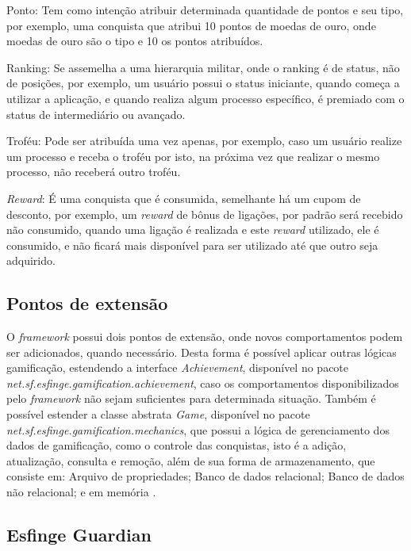 \par Ponto: Tem como intenção atribuir determinada quantidade de pontos e seu tipo, por exemplo, uma conquista que atribui 10 pontos de moedas de ouro, onde moedas de ouro são o tipo e 10 os pontos atribuídos. 
\par Ranking: Se assemelha a uma hierarquia militar, onde o ranking é de status, não de posições, por exemplo, um usuário possui o status iniciante, quando começa a utilizar a aplicação, e quando realiza algum processo específico, é premiado com o status de intermediário ou avançado. 
\par Troféu: Pode ser atribuída uma vez apenas, por exemplo, caso um usuário realize um processo e receba o troféu por isto, na próxima vez que realizar o mesmo processo, não receberá outro troféu. 
\par \textit{Reward}: É uma conquista que é consumida, semelhante há um cupom de desconto, por exemplo, um \textit{reward} de bônus de ligações, por padrão será recebido não consumido, quando uma ligação é realizada e este \textit{reward} utilizado, ele é consumido, e não ficará mais disponível para ser utilizado até que outro seja adquirido.

\subsection{Pontos de extensão}

O \textit{framework} possui dois pontos de extensão, onde novos comportamentos podem ser adicionados, quando necessário. Desta forma é possível aplicar outras lógicas gamificação, estendendo a interface \textit{Achievement}, disponível no pacote \textit{net.sf.esfinge.gamification.achievement}, caso os comportamentos disponibilizados pelo \textit{framework} não sejam suficientes para determinada situação. Também é possível estender a classe abstrata \textit{Game}, disponível no pacote \textit{net.sf.esfinge.gamification.mechanics}, que possui a lógica de gerenciamento dos dados de gamificação, como o controle das conquistas, isto é a adição, atualização, consulta e remoção, além de sua forma de armazenamento, que consiste em: Arquivo de propriedades; Banco de dados relacional; Banco de dados não relacional; e em memória \cite{esfinge2011}.

\subsection{Esfinge Guardian}

